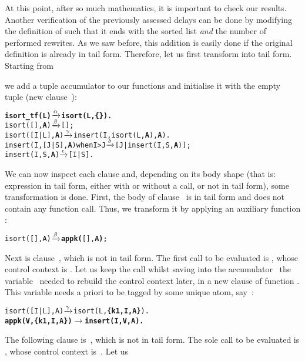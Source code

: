 At this point, after so much mathematics, it is important to check our
results. Another verification of the previously assessed delays can be
done by modifying the definition of  such that it
ends with the sorted list \emph{and} the number of performed
rewrites. As we saw before, this addition is easily done if the
original definition is already in tail form. Therefore, let us first
transform  into tail form. Starting from

we add a tuple accumulator to our functions and initialise it with the
empty tuple (new clause~\clause{\alpha}):
\begin{alltt}
\textbf{isort_tf(L)                  \(\smashedrightarrow{\alpha}\) isort(L,\{\}).}
isort(   [],\textbf{A})               \(\smashedrightarrow{\beta}\) [];\hfill% A \emph{unused yet}
isort([I|L],\textbf{A})               \(\smashedrightarrow{\gamma}\) insert(I,isort(L,\textbf{A}),\textbf{A}).
insert(I,[J|S],\textbf{A}) when I > J \(\smashedrightarrow{\delta}\) [J|insert(I,S,\textbf{A})];
insert(I,    S,\textbf{A})            \(\smashedrightarrow{\epsilon}\) [I|S].\hfill% A \emph{unused yet}
\end{alltt}
We can now inspect each clause and, depending on its body shape (that
is: expression in tail form, either with or without a call, or not in
tail form), some transformation is done. First, the body of
clause~\clause{\beta} is in tail form and does not contain any
function call. Thus, we transform it by applying an auxiliary
function :
\begin{alltt}
isort(   [],A)               \(\smashedrightarrow{\beta}\) \textbf{appk(}[],\textbf{A)};
\end{alltt}
Next is clause~\clause{\gamma}, which is not in tail form. The first
call to be evaluated is , whose control context is
. Let us keep the call whilst
saving into the accumulator~ the variable~
needed to rebuild the control context later, in a new clause of
function . This variable needs a priori to be tagged
by some unique atom, say~:
\begin{alltt}
isort([I|L],A)               \(\smashedrightarrow{\gamma}\) isort(L,\textbf{\{k1,I,A\}}).
\textbf{appk(V,\{k1,I,A\})             \(\rightarrow\) insert(I,V,A).}
\end{alltt}
The following clause is~\clause{\delta}, which is not in tail
form. The sole call to be evaluated is , whose
control context is~\erlcode{[J|\textvisiblespace]}. Let us

